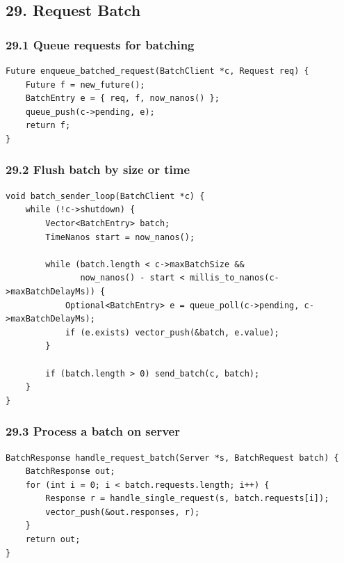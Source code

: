 \documentclass[10pt,letterpaper]{article}
\begin{document}
\subsection*{29. Request Batch}

\subsubsection*{29.1 Queue requests for batching}

\begin{verbatim}
Future enqueue_batched_request(BatchClient *c, Request req) {
    Future f = new_future();
    BatchEntry e = { req, f, now_nanos() };
    queue_push(c->pending, e);
    return f;
}
\end{verbatim}

\subsubsection*{29.2 Flush batch by size or time}

\begin{verbatim}
void batch_sender_loop(BatchClient *c) {
    while (!c->shutdown) {
        Vector<BatchEntry> batch;
        TimeNanos start = now_nanos();

        while (batch.length < c->maxBatchSize &&
               now_nanos() - start < millis_to_nanos(c->maxBatchDelayMs)) {
            Optional<BatchEntry> e = queue_poll(c->pending, c->maxBatchDelayMs);
            if (e.exists) vector_push(&batch, e.value);
        }

        if (batch.length > 0) send_batch(c, batch);
    }
}
\end{verbatim}

\subsubsection*{29.3 Process a batch on server}

\begin{verbatim}
BatchResponse handle_request_batch(Server *s, BatchRequest batch) {
    BatchResponse out;
    for (int i = 0; i < batch.requests.length; i++) {
        Response r = handle_single_request(s, batch.requests[i]);
        vector_push(&out.responses, r);
    }
    return out;
}
\end{verbatim}
\end{document}
